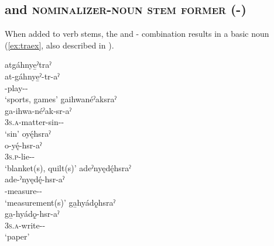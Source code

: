 \subsection{ and  \textsc{nominalizer-noun stem former} (\textsc{\nominalizer-\nsf})} \label{[-tr-aˀ] and [-(h)sr-aˀ]}
When added to verb stems, the  and  \textsc{\nominalizer-\nsf} combination results in a basic noun (\ref{ex:traex}, also described in ).

\ea\label{ex:traex}
\ea atgáhnye̱ˀtraˀ\\
\gll at-gáhnye̱ˀ-tr-aˀ\\
 -play-{\nominalizer}-{\nsf}\\
\glt `sports, games'
\ex gaihwanéˀaksraˀ\\
\gll ga-ihwa-néˀak-sr-aˀ\\
 \textsc{3s.a}-matter-sin-{\nominalizer}-{\nsf}\\
\glt `sin'
\ex oyę́hsraˀ\\
\gll o-yę́-hsr-aˀ\\
 \textsc{3s.p}-lie-{\nominalizer}-{\nsf}\\
\glt `blanket(s), quilt(s)'
\ex adeˀnyędę́hsraˀ\\
\gll ade-ˀnyędę́-hsr-aˀ\\
 -measure-{\nominalizer}-{\nsf}\\
\glt `measurement(s)'
\ex ga̱hyádǫ̱hsraˀ\\
\gll ga̱-hyádǫ̱-hsr-aˀ\\
 \textsc{3s.a}-write-{\nominalizer}-{\nsf}\\
\glt `paper'
\z
\z


